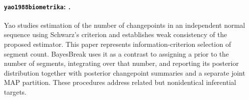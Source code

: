 \paragraph{\texttt{yao1988biometrika}: \citet{yao1988biometrika}.}
Yao studies estimation of the number of changepoints in an independent normal sequence using Schwarz's criterion and establishes weak consistency of the proposed estimator. This paper represents information-criterion selection of segment count. BayesBreak uses it as a contrast to assigning a prior to the number of segments, integrating over that number, and reporting its posterior distribution together with posterior changepoint summaries and a separate joint MAP partition. These procedures address related but nonidentical inferential targets.
